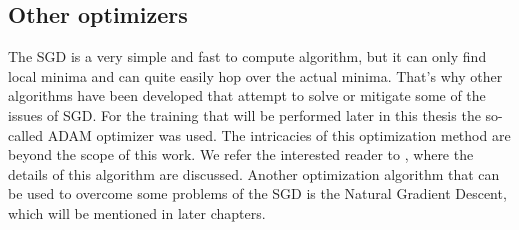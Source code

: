 \subsection{Other optimizers}
The SGD is a very simple and fast to compute algorithm, but it can only find local minima and can quite easily hop over the actual minima. That's why other algorithms have been developed that attempt to solve or mitigate some of the issues of SGD. For the training that will be performed later in this thesis the so-called ADAM optimizer was used. The intricacies of this optimization method are beyond the scope of this work. We refer the interested reader to \cite{adamPaper}, where the details of this algorithm are discussed. Another optimization algorithm that can be used to overcome some problems of the SGD is the Natural Gradient Descent, which will be mentioned in later chapters.


